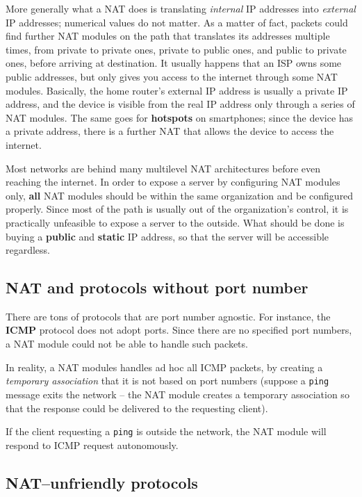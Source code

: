 \documentclass[10pt]{extbook}
\begin{document}
More generally what a NAT does is translating \emph{internal} IP addresses into
\emph{external} IP addresses; numerical values do not matter. As a matter of
fact, packets could find further NAT modules on the path that translates its
addresses multiple times, from private to private ones, private to public ones,
and public to private ones, before arriving at destination. It usually happens
that an ISP owns some public addresses, but only gives you access to the
internet through some NAT modules. Basically, the home router's external IP
address is usually a private IP address, and the device is visible from the
real IP address only through a series of NAT modules. The same goes for
\textbf{hotspots} on smartphones; since the device has a private address, there
is a further NAT that allows the device to access the internet.

Most networks are behind many multilevel NAT architectures before even reaching
the internet. In order to expose a server by configuring NAT modules only,
\textbf{all} NAT modules should be within the same organization and be
configured properly. Since most of the path is usually out of the
organization's control, it is practically unfeasible to expose a server to the
outside. What should be done is buying a \textbf{public} and \textbf{static} IP
address, so that the server will be accessible regardless.

\subsection{NAT and protocols without port number}

There are tons of protocols that are port number agnostic. For instance, the \textbf{ICMP} protocol does not adopt ports. Since there are no specified port numbers, a NAT module could not be able to handle such packets.

In reality, a NAT modules handles ad hoc all ICMP packets, by creating a
\emph{temporary association} that it is not based on port numbers (suppose a
\texttt{ping} message exits the network -- the NAT module creates a temporary
association so that the response could be delivered to the requesting client). 

If the client requesting a \texttt{ping} is outside the network, the NAT module
will respond to ICMP request autonomously.

\subsection{NAT--unfriendly protocols}
\end{document}
